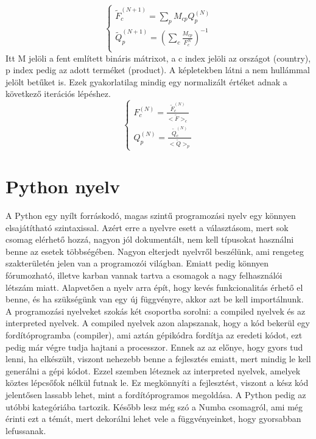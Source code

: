 \documentclass{article}
\theoremstyle{definition}
\theoremstyle{theorem}
\begin{document}
\begin{equation*}
    \begin{cases}
    \widetilde{F}_{c}^{(N + 1)} = \sum_{p} M_{cp} Q_{p}^{(N)} \\
    \widetilde{Q}_{p}^{(N+1)} = (\sum_{c} \frac{M_{cp}}{F_c^N})^{-1} \\

    \end{cases}
\end{equation*}
Itt M jelöli a fent említett bináris mátrixot, a c index jelöli az országot (country), p index pedig az adott terméket (product). A képletekben látni a nem hullámmal jelölt betűket is. Ezek gyakorlatilag mindig egy normalizált értéket adnak a következő iterációs lépéshez.
\begin{equation*}
    \begin{cases}
    F_c^{(N)} = \frac{\widetilde{F}_{c}^{(N)}}{<\widetilde{F}>_c} \\
    Q_p^{(N)} = \frac{\widetilde{Q}_{c}^{(N)}}{<\widetilde{Q}>_p}
    \end{cases}
\end{equation*}


\section{Python nyelv}

A Python egy nyílt forráskodó, magas szintű programozási nyelv egy könnyen elsajátítható szintaxissal. Azért erre a nyelvre esett
a választásom, mert sok csomag elérhető hozzá, nagyon jól dokumentált, nem kell típusokat használni benne az
esetek többségében. Nagyon elterjedt nyelvről beszélünk, ami rengeteg szakterületén jelen van a programozói világban. Emiatt pedig könnyen fórumozható, illetve karban vannak tartva a csomagok a nagy felhasználói létszám miatt. Alapvetően a nyelv arra épít, hogy kevés funkcionalitás érhető el benne, és ha szükségünk van egy új függvényre, akkor azt be kell importálnunk. A programozási nyelveket szokás két csoportba sorolni: a compiled nyelvek és az interpreted nyelvek. A compiled nyelvek azon alapszanak, hogy a kód bekerül egy fordítóprogramba (compiler), ami aztán gépikódra fordítja az eredeti kódot, ezt pedig már végre tudja hajtani a processzor. Ennek az az előnye, hogy gyors tud lenni, ha elkészült, viszont nehezebb benne a fejlesztés emiatt, mert mindig le kell generálni a gépi kódot. Ezzel szemben léteznek az interpreted nyelvek, amelyek köztes lépcsőfok nélkül futnak le. Ez megkönnyíti a fejlesztést, viszont a kész kód jelentősen lassabb lehet, mint a fordítóprogramos megoldása. A Python pedig az utóbbi kategóriába tartozik. Később lesz még szó a Numba csomagról, ami még érinti ezt a témát, mert dekorálni lehet vele a függvényeinket, hogy gyorsabban lefussanak.
\end{document}
